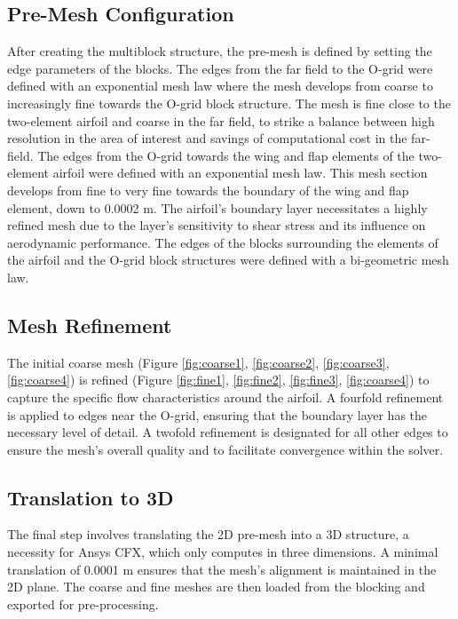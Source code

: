 \subsection{Pre-Mesh Configuration}
After creating the multiblock structure, the pre-mesh is defined by setting the edge parameters of the blocks. The edges from the far field to the O-grid were defined with an exponential mesh law where the mesh develops from coarse to increasingly fine towards the O-grid block structure. The mesh is fine close to the two-element airfoil and coarse in the far field, to strike a balance between high resolution in the area of interest and savings of computational cost in the far-field. The edges from the O-grid towards the wing and flap elements of the two-element airfoil were defined with an exponential mesh law. This mesh section develops from fine to very fine towards the boundary of the wing and flap element, down to 0.0002 m. The airfoil's boundary layer necessitates a highly refined mesh due to the layer's sensitivity to shear stress and its influence on aerodynamic performance. The edges of the blocks surrounding the elements of the airfoil and the O-grid block structures were defined with a bi-geometric mesh law.



\subsection{Mesh Refinement}
The initial coarse mesh (Figure \ref{fig:coarse1}, \ref{fig:coarse2}, \ref{fig:coarse3}, \ref{fig:coarse4}) is refined (Figure \ref{fig:fine1}, \ref{fig:fine2}, \ref{fig:fine3}, \ref{fig:coarse4}) to capture the specific flow characteristics around the airfoil. A fourfold refinement is applied to edges near the O-grid, ensuring that the boundary layer has the necessary level of detail. A twofold refinement is designated for all other edges to ensure the mesh's overall quality and to facilitate convergence within the solver.

\subsection{Translation to 3D}
The final step involves translating the 2D pre-mesh into a 3D structure, a necessity for Ansys CFX, which only computes in three dimensions. A minimal translation of 0.0001 m ensures that the mesh's alignment is maintained in the 2D plane. The coarse and fine meshes are then loaded from the blocking and exported for pre-processing.





